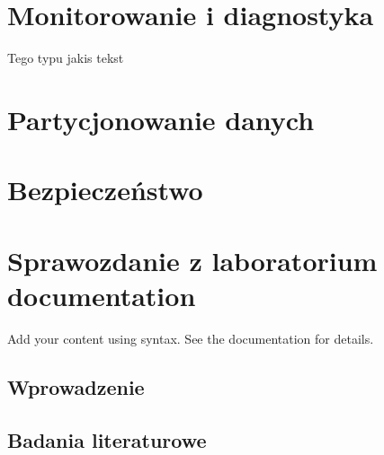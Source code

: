 \documentclass[letterpaper,10pt,english]{sphinxmanual}
\begin{document}
\sphinxstepscope


\section{Monitorowanie i diagnostyka}
\label{\detokenize{rozdzial_2/rozdzial_24/index:monitorowanie-i-diagnostyka}}\label{\detokenize{rozdzial_2/rozdzial_24/index::doc}}
\sphinxstepscope

\sphinxAtStartPar
Tego typu jakis tekst

\sphinxstepscope


\section{Partycjonowanie danych}
\label{\detokenize{rozdzial_2/rozdzial_26/index:partycjonowanie-danych}}\label{\detokenize{rozdzial_2/rozdzial_26/index::doc}}
\sphinxstepscope


\section{Bezpieczeństwo}
\label{\detokenize{rozdzial_2/rozdzial_27/index:bezpieczenstwo}}\label{\detokenize{rozdzial_2/rozdzial_27/index::doc}}
\sphinxstepscope


\section{Sprawozdanie z laboratorium documentation}
\label{\detokenize{rozdzial_2/rozdzial_28/source/index:sprawozdanie-z-laboratorium-documentation}}\label{\detokenize{rozdzial_2/rozdzial_28/source/index::doc}}
\sphinxAtStartPar
Add your content using  syntax. See the
documentation for details.

\sphinxstepscope


\subsection{Wprowadzenie}
\label{\detokenize{rozdzial_2/rozdzial_28/source/rozdzial_1/index:wprowadzenie}}\label{\detokenize{rozdzial_2/rozdzial_28/source/rozdzial_1/index::doc}}
\sphinxstepscope


\subsection{Badania literaturowe}
\label{\detokenize{rozdzial_2/rozdzial_28/source/rozdzial_2/index:badania-literaturowe}}\label{\detokenize{rozdzial_2/rozdzial_28/source/rozdzial_2/index::doc}}
\sphinxstepscope
\end{document}
